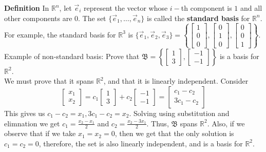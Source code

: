 \documentclass[10pt,letter]{article}
\begin{document}
\textbf{Definition} In $\mathbb{R}^n$, let $\vec{e}_i$ represent the vector whose $i-$th component is $1$ and all other components are $0$. The set $\{\vec{e}_1,\ldots,\vec{e}_n\}$ is called the \textbf{standard basis} for $\mathbb{R}^n$. For example, the standard basis for $\mathbb{R}^3$ is $\{\vec{e}_1,\vec{e}_2,\vec{e}_3\}=\left\{\begin{bmatrix}1\\0\\0\end{bmatrix},\begin{bmatrix}0\\1\\0\end{bmatrix},\begin{bmatrix}0\\0\\1\end{bmatrix}\right\}$. \\ 
Example of non-standard basis: Prove that $\mathfrak{B}=\left\{\begin{bmatrix}1\\3\end{bmatrix},\begin{bmatrix}-1\\-1\end{bmatrix}\right\}$ is a basis for $\mathbb{R}^2$. \\ 
We must prove that it spans $\mathbb{R}^2$, and that it is linearly independent. Consider $$\begin{bmatrix}x_1\\x_2\end{bmatrix}=c_1\begin{bmatrix}1\\3\end{bmatrix}+c_2\begin{bmatrix}-1\\-1\end{bmatrix} = \begin{bmatrix}c_1-c_2\\3c_1-c_2\end{bmatrix}$$ This gives us $c_1-c_2=x_1,3c_1-c_2=x_2$. Solving using substitution and elimnation we get $c_1=\frac{x_2-x_1}{2}$ and $c_2=\frac{x_2-3x_1}{2}$. Thus, $\mathfrak{B}$ spans $\mathbb{R}^2$. Also, if we observe that if we take $x_1=x_2=0$, then we get that the only solution is $c_1=c_2=0$, therefore, the set is also linearly independent, and is a basis for $\mathbb{R}^2$. 
\end{document}
